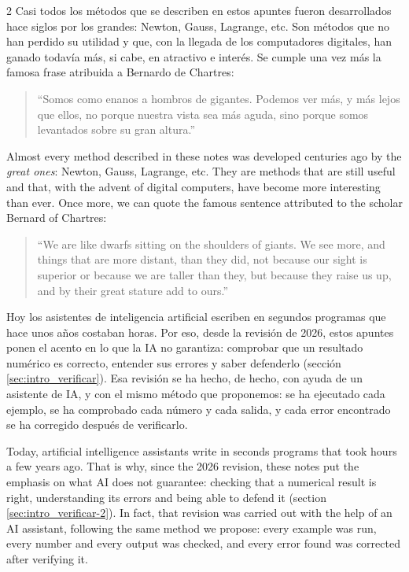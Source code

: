 \begin{paracol}{2}
\switchcolumn
Casi todos los métodos que se describen en estos apuntes fueron desarrollados hace siglos por los grandes: Newton, Gauss, Lagrange, etc. Son métodos que no han perdido su utilidad y que, con la llegada de los computadores digitales, han ganado todavía más, si cabe, en atractivo e interés. Se cumple una vez más la famosa frase atribuida a Bernardo de Chartres:
\begin{quote}
``Somos como enanos a hombros de gigantes. Podemos ver más, y más lejos que ellos, no porque nuestra vista sea más aguda, sino porque somos levantados sobre su gran altura.''
\end{quote}
\switchcolumn
Almost every method described in these notes was developed centuries ago by the \emph{great ones}: Newton, Gauss, Lagrange, etc. They are methods that are still useful and that, with the advent of digital computers, have become more interesting than ever. Once more, we can quote the famous sentence attributed to the scholar Bernard of Chartres:
\begin{quote}
``We are like dwarfs sitting on the shoulders of giants. We see more, and things that are more distant, than they did, not because our sight is superior or because we are taller than they, but because they raise us up, and by their great stature add to ours.''
\end{quote}

\switchcolumn
Hoy los asistentes de inteligencia artificial escriben en segundos programas que hace unos años costaban horas. Por eso, desde la revisión de 2026, estos apuntes ponen el acento en lo que la IA no garantiza: comprobar que un resultado numérico es correcto, entender sus errores y saber defenderlo (sección \ref{sec:intro_verificar}). Esa revisión se ha hecho, de hecho, con ayuda de un asistente de IA, y con el mismo método que proponemos: se ha ejecutado cada ejemplo, se ha comprobado cada número y cada salida, y cada error encontrado se ha corregido después de verificarlo.

\switchcolumn
Today, artificial intelligence assistants write in seconds programs that took hours a few years ago. That is why, since the 2026 revision, these notes put the emphasis on what AI does not guarantee: checking that a numerical result is right, understanding its errors and being able to defend it (section \ref{sec:intro_verificar-2}). In fact, that revision was carried out with the help of an AI assistant, following the same method we propose: every example was run, every number and every output was checked, and every error found was corrected after verifying it.


\end{paracol}
